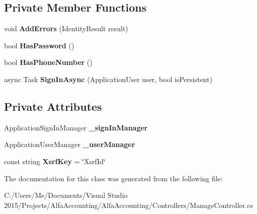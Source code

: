 \subsection*{Private Member Functions}
\begin{DoxyCompactItemize}
\item 
\mbox{\label{class_alfa_accounting_1_1_controllers_1_1_manage_controller_a01d6765e3e620557668e088b39ab1b39}} 
void {\bfseries Add\+Errors} (Identity\+Result result)
\item 
\mbox{\label{class_alfa_accounting_1_1_controllers_1_1_manage_controller_adbb5d05e535a12719155d192fa2779fb}} 
bool {\bfseries Has\+Password} ()
\item 
\mbox{\label{class_alfa_accounting_1_1_controllers_1_1_manage_controller_a7fbcd49a15902a24c9b55088dd68a60a}} 
bool {\bfseries Has\+Phone\+Number} ()
\item 
\mbox{\label{class_alfa_accounting_1_1_controllers_1_1_manage_controller_aa112f462595bebb99f92142a63b969c0}} 
async Task {\bfseries Sign\+In\+Async} (Application\+User user, bool is\+Persistent)
\end{DoxyCompactItemize}
\subsection*{Private Attributes}
\begin{DoxyCompactItemize}
\item 
\mbox{\label{class_alfa_accounting_1_1_controllers_1_1_manage_controller_a5e1dca327f983375f40789e802a4a246}} 
Application\+Sign\+In\+Manager {\bfseries \+\_\+sign\+In\+Manager}
\item 
\mbox{\label{class_alfa_accounting_1_1_controllers_1_1_manage_controller_a6021a11b6662a2ad96b11c9f018d2b44}} 
Application\+User\+Manager {\bfseries \+\_\+user\+Manager}
\item 
\mbox{\label{class_alfa_accounting_1_1_controllers_1_1_manage_controller_a5770e68e86b2ee496a39047bd52125fc}} 
const string {\bfseries Xsrf\+Key} = \char`\"{}Xsrf\+Id\char`\"{}
\end{DoxyCompactItemize}


The documentation for this class was generated from the following file\+:\begin{DoxyCompactItemize}
\item 
C\+:/\+Users/\+Me/\+Documents/\+Visual Studio 2015/\+Projects/\+Alfa\+Accounting/\+Alfa\+Accounting/\+Controllers/Manage\+Controller.\+cs\end{DoxyCompactItemize}
